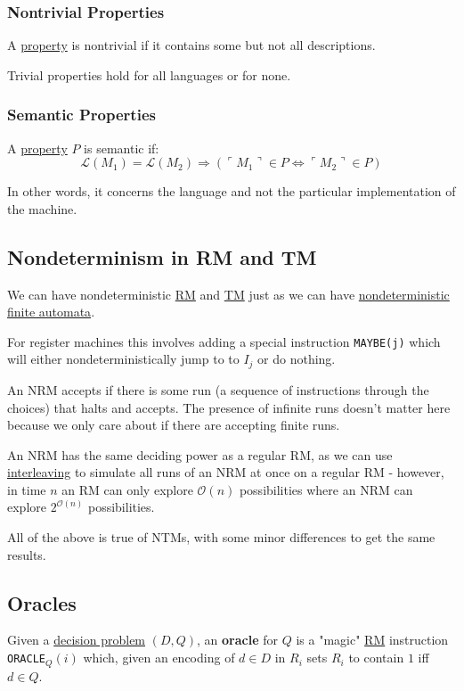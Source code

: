 \documentclass{article}
\begin{document}
\subsubsection{Nontrivial Properties}\label{nontrivial}
A \hyperref[property]{property} is nontrivial if it contains some but not all descriptions.

Trivial properties hold for all languages or for none.

\subsubsection{Semantic Properties}\label{semantic}
A \hyperref[property]{property} $P$ is semantic if:
\[\mathcal{L}(M_1) = \mathcal{L}(M_2) \Rightarrow (\ulcorner M_1 \urcorner \in P \Leftrightarrow \ulcorner M_2 \urcorner \in P)\]

In other words, it concerns the language and not the particular implementation of the machine.


\subsection{Nondeterminism in RM and TM}\label{nrm}\label{ntm}
We can have nondeterministic \hyperref[rm]{RM} and \hyperref[tm]{TM} just as we can have \hyperref[nfa]{nondeterministic finite automata}.

For register machines this involves adding a special instruction \texttt{MAYBE(j)} which will either nondeterministically jump to to $I_j$ or do nothing.

An NRM accepts if there is some run (a sequence of instructions through the choices) that halts and accepts. The presence of infinite runs doesn't matter here because we only care about if there are accepting finite runs.

An NRM has the same deciding power as a regular RM, as we can use \hyperref[interleaving]{interleaving} to simulate all runs of an NRM at once on a regular RM - however, in time $n$ an RM can only explore $\mathcal{O}(n)$ possibilities where an NRM can explore $2^{\mathcal{O}(n)}$ possibilities.

All of the above is true of NTMs, with some minor differences to get the same results.


\subsection{Oracles}\label{oracle}
Given a \hyperref[decision-problem]{decision problem} $(D, Q)$, an \textbf{oracle} for $Q$ is a "magic" \hyperref[rm]{RM} instruction \texttt{ORACLE}$_Q(i)$ which, given an encoding of $d \in D$ in $R_i$ sets $R_i$ to contain $1$ iff $d \in Q$.
\end{document}
